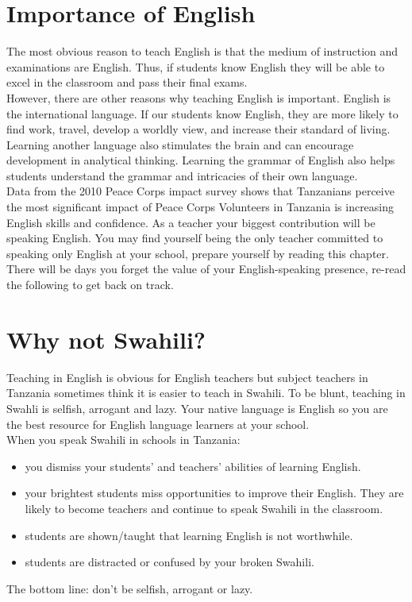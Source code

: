 \section{Importance of English}

The most obvious reason to teach English is that the medium of instruction
and examinations are English. Thus, if students know English they
will be able to excel in the classroom and pass their final exams.\\


However, there are other reasons why teaching English is important.
English is the international language. If our students know English,
they are more likely to find work, travel, develop a worldly view,
and increase their standard of living. Learning another language also
stimulates the brain and can encourage development in analytical thinking.
Learning the grammar of English also helps students understand the
grammar and intricacies of their own language.\\


Data from the 2010 Peace Corps impact survey shows that Tanzanians
perceive the most significant impact of Peace Corps Volunteers in
Tanzania is increasing English skills and confidence. As a teacher
your biggest contribution will be speaking English. You may find yourself
being the only teacher committed to speaking only English at your
school, prepare yourself by reading this chapter. There will be days
you forget the value of your English-speaking presence, re-read the
following to get back on track.


\section{Why not Swahili?}

Teaching in English is obvious for English teachers but subject teachers
in Tanzania sometimes think it is easier to teach in Swahili. To be
blunt, teaching in Swahli is selfish, arrogant and lazy. Your native
language is English so you are the best resource for English language
learners at your school.\\


When you speak Swahili in schools in Tanzania:
\begin{itemize}
\item you dismiss your students' and teachers' abilities of learning English. 
\item your brightest students miss opportunities to improve their English.
They are likely to become teachers and continue to speak Swahili in
the classroom.
\item students are shown/taught that learning English is not worthwhile.
\item students are distracted or confused by your broken Swahili. 
\end{itemize}
The bottom line: don't be selfish, arrogant or lazy.

